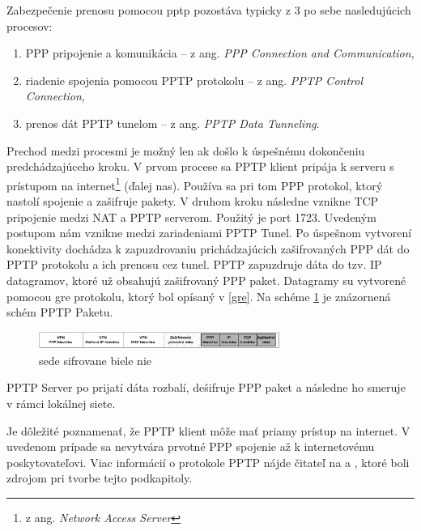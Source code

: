 Zabezpečenie prenosu pomocou \acrshort{pptp} pozostáva typicky z 3 po sebe nasledujúcich procesov:
\begin{enumerate}
	\item{PPP pripojenie a komunikácia } -- z ang. \textit{PPP Connection and Communication},
	\item{riadenie spojenia pomocou PPTP protokolu} -- z ang. \textit{PPTP Control Connection},
	\item{prenos dát PPTP tunelom} -- z ang. \textit{PPTP Data Tunneling}.
\end{enumerate}
Prechod medzi procesmi je možný len ak došlo k úspešnému dokončeniu predchádzajúceho kroku. V prvom procese sa PPTP klient pripája k serveru s prístupom na internet\footnote{z ang. \textit{Network Access Server}} (ďalej \acrshort{nas}). Používa sa pri tom PPP protokol, ktorý nastolí spojenie a zašifruje pakety. V druhom kroku následne vznikne TCP pripojenie medzi NAT a PPTP serverom. Použitý je port 1723. Uvedeným postupom nám vznikne medzi zariadeniami PPTP Tunel. Po úspešnom vytvorení konektivity dochádza k zapuzdrovaniu prichádzajúcich zašifrovaných PPP dát do PPTP protokolu a ich prenosu cez tunel. PPTP zapuzdruje dáta do tzv. IP datagramov, ktoré už obsahujú zašifrovaný PPP paket. Datagramy su vytvorené pomocou \acrshort{gre} protokolu, ktorý bol opísaný v \ref{gre}. Na schéme \ref{pptpdat} je znázornená schém PPTP Paketu. 

\begin{figure}
	\centering
	\includegraphics[width=0.7\textwidth]{figures/pptpdat}
	\caption{sede sifrovane biele nie }
	\label{pptpdat}
\end{figure}

PPTP Server po prijatí dáta rozbalí, dešifruje PPP paket a následne ho smeruje v rámci lokálnej siete.

Je dôležité poznamenať, že PPTP klient môže mať priamy prístup na internet. V uvedenom prípade sa nevytvára prvotné PPP spojenie až k internetovému poskytovateľovi.
Viac informácií o protokole PPTP nájde čitateľ na \cite{rfc2637} a \cite{pptp}, ktoré boli zdrojom pri tvorbe tejto podkapitoly.
